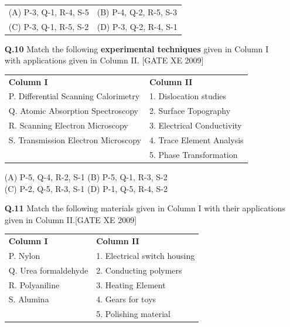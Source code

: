 \documentclass[journal,12pt,onecolumn]{IEEEtran}
\theoremstyle{remark}
\begin{document}
\begin{enumerate}
\vspace{1em}

\noindent
\begin{tabular}{@{}ll@{}}
(A) P-3, Q-1, R-4, S-5 & (B) P-4, Q-2, R-5, S-3 \\
(C) P-3, Q-1, R-5, S-2 & (D) P-3, Q-2, R-4, S-1 \\
\end{tabular}

\vspace{2em}
\item[\textbf{Q.10}] Match the following \textbf{experimental techniques} given in Column I with applications given in Column II.
\hfill[GATE XE 2009]
\vspace{1em}

\begin{tabular}{p{7cm} p{6cm}}
\textbf{Column I} & \textbf{Column II} \\
P. Differential Scanning Calorimetry & 1. Dislocation studies \\
Q. Atomic Absorption Spectroscopy & 2. Surface Topography \\
R. Scanning Electron Microscopy & 3. Electrical Conductivity \\
S. Transmission Electron Microscopy & 4. Trace Element Analysis \\
& 5. Phase Transformation \\
\end{tabular}

\vspace{1em}

\noindent
(A) P-5, Q-4, R-2, S-1 \quad
(B) P-5, Q-1, R-3, S-2 \\
(C) P-2, Q-5, R-3, S-1 \quad
(D) P-1, Q-5, R-4, S-2
\item[\textbf{Q.11}] Match the following materials given in Column I with their applications given in Column II.\hfill[GATE XE 2009]

\vspace{1em}

\begin{tabular}{p{6cm} p{6cm}}
\textbf{Column I} & \textbf{Column II} \\
P. Nylon & 1. Electrical switch housing \\
Q. Urea formaldehyde & 2. Conducting polymers \\
R. Polyaniline & 3. Heating Element \\
S. Alumina & 4. Gears for toys \\
& 5. Polishing material \\
\end{tabular}


\end{enumerate}
\end{document}
